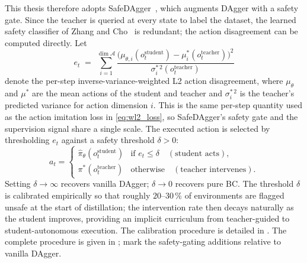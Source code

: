 This thesis therefore adopts SafeDAgger~\cite{Zhang2016}, which augments DAgger with a safety gate.
Since the teacher is queried at every state to label the dataset, the learned safety classifier of Zhang and Cho~\cite{Zhang2016} is redundant; the action disagreement can be computed directly.
Let
%
\begin{equation}\label{eq:safety_label}
    e_t \;=\; \sum_{i=1}^{\dim \mathcal{A}} \frac{\bigl(\mu_{\theta,i}(o_t^{\text{student}}) - \mu^*_i(o_t^{\text{teacher}})\bigr)^2}{\sigma^{*\,2}_i(o_t^{\text{teacher}})}
\end{equation}
%
denote the per-step inverse-variance-weighted L2 action disagreement, where $\mu_\theta$ and $\mu^*$ are the mean actions of the student and teacher and $\sigma^{*\,2}_i$ is the teacher's predicted variance for action dimension $i$.
This is the same per-step quantity used as the action imitation loss in \cref{eq:wl2_loss}, so SafeDAgger's safety gate and the supervision signal share a single scale.
The executed action is selected by thresholding $e_t$ against a safety threshold $\delta > 0$:
%
\begin{equation}\label{eq:safedagger_intervention}
    a_t = \begin{cases}
        \hat{\pi}_\theta(o_t^{\text{student}}) & \text{if } e_t \leq \delta \quad (\text{student acts}), \\
        \pi^*(o_t^{\text{teacher}}) & \text{otherwise} \quad (\text{teacher intervenes}).
    \end{cases}
\end{equation}
%
Setting $\delta \to \infty$ recovers vanilla DAgger; $\delta \to 0$ recovers pure \ac{BC}.
The threshold $\delta$ is calibrated empirically so that roughly $20$--$30$\,\% of environments are flagged unsafe at the start of distillation; the intervention rate then decays naturally as the student improves, providing an implicit curriculum from teacher-guided to student-autonomous execution.
The calibration procedure is detailed in .
The complete procedure is given in ;  mark the safety-gating additions relative to vanilla DAgger.


